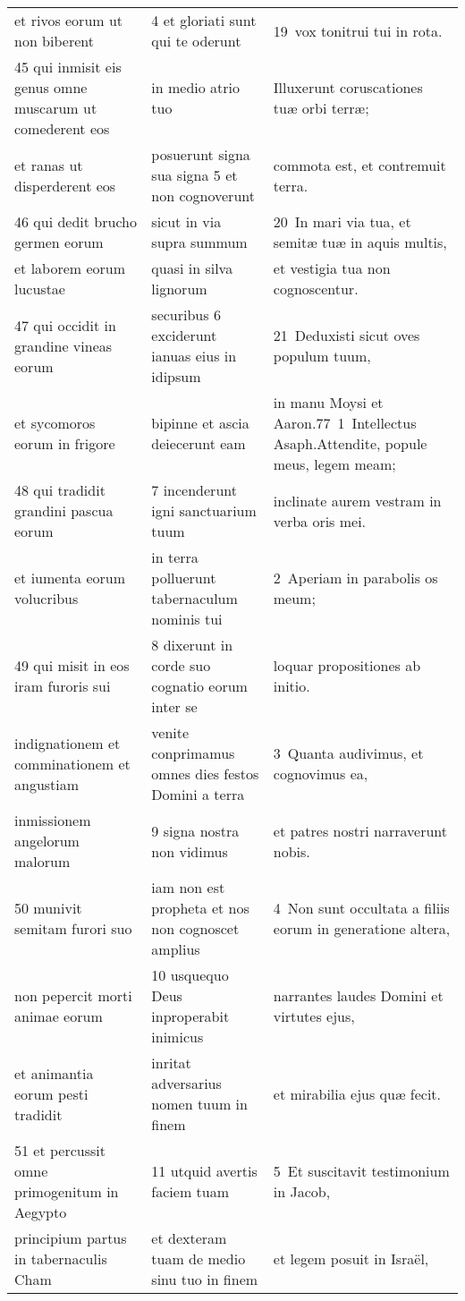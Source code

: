 \documentclass{article}
\begin{document}
\begin{longtable}{@{}p{}p{}p{}@{}}
et rivos eorum ut non biberent	&	4 et gloriati sunt qui te oderunt	&	19 vox tonitrui tui in rota.	\\
45 qui inmisit eis genus omne muscarum ut comederent eos	&	in medio atrio tuo	&	Illuxerunt coruscationes tuæ orbi terræ;	\\
et ranas ut disperderent eos	&	posuerunt signa sua signa 5 et non cognoverunt	&	commota est, et contremuit terra.	\\
46 qui dedit brucho germen eorum	&	sicut in via supra summum	&	20 In mari via tua, et semitæ tuæ in aquis multis,	\\
et laborem eorum lucustae	&	quasi in silva lignorum	&	et vestigia tua non cognoscentur.	\\
47 qui occidit in grandine vineas eorum	&	securibus 6 exciderunt ianuas eius in idipsum	&	21 Deduxisti sicut oves populum tuum,	\\
et sycomoros eorum in frigore	&	bipinne et ascia deiecerunt eam	&	in manu Moysi et Aaron.77 1 Intellectus Asaph.Attendite, popule meus, legem meam;	\\
48 qui tradidit grandini pascua eorum	&	7 incenderunt igni sanctuarium tuum	&	inclinate aurem vestram in verba oris mei.	\\
et iumenta eorum volucribus	&	in terra polluerunt tabernaculum nominis tui	&	2 Aperiam in parabolis os meum;	\\
49 qui misit in eos iram furoris sui	&	8 dixerunt in corde suo cognatio eorum inter se	&	loquar propositiones ab initio.	\\
indignationem et comminationem et angustiam	&	venite conprimamus omnes dies festos Domini a terra	&	3 Quanta audivimus, et cognovimus ea,	\\
inmissionem angelorum malorum	&	9 signa nostra non vidimus	&	et patres nostri narraverunt nobis.	\\
50 munivit semitam furori suo	&	iam non est propheta et nos non cognoscet amplius	&	4 Non sunt occultata a filiis eorum in generatione altera,	\\
non pepercit morti animae eorum	&	10 usquequo Deus inproperabit inimicus	&	narrantes laudes Domini et virtutes ejus,	\\
et animantia eorum pesti tradidit	&	inritat adversarius nomen tuum in finem	&	et mirabilia ejus quæ fecit.	\\
51 et percussit omne primogenitum in Aegypto	&	11 utquid avertis faciem tuam	&	5 Et suscitavit testimonium in Jacob,	\\
principium partus in tabernaculis Cham	&	et dexteram tuam de medio sinu tuo in finem	&	et legem posuit in Israël,	\\

\end{longtable}
\end{document}
